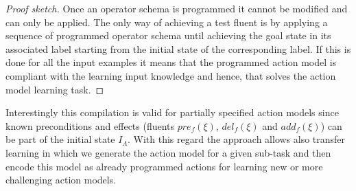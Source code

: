 \documentclass[letterpaper]{article} %
\begin{document}
\begin{proof}[Proof sketch]
Once an operator schema is programmed it cannot be modified and can only be applied. The only way of achieving a test fluent is by applying a sequence of programmed operator schema until achieving the goal state in its associated label starting from the initial state of the corresponding label. If this is done for all the input examples it means that the programmed action model is compliant with the learning input knowledge and hence, that solves the action model learning task.
\end{proof}

Interestingly this compilation is valid for partially specified action models since known preconditions and effects (fluents $pre_f(\xi)$, $del_f(\xi)$ and $add_f(\xi)$) can be part of the initial state $I_{\Lambda}$. With this regard the approach allows also transfer learning in which we generate the action model for a given sub-task and then encode this model as already programmed actions for learning new or more challenging action models.
\end{document}
